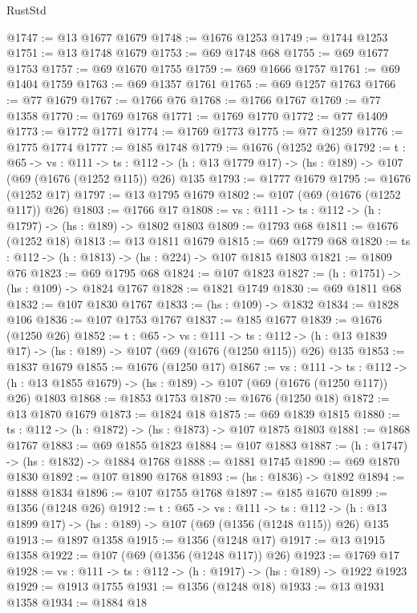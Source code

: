 \begin{lexlean}{RustStd}
\begin{coremodule}
@1747 := @13 @1677 @1679
@1748 := @1676 @1253
@1749 := @1744 @1253
@1751 := @13 @1748 @1679
@1753 := @69 @1748 @68
@1755 := @69 @1677 @1753
@1757 := @69 @1670 @1755
@1759 := @69 @1666 @1757
@1761 := @69 @1404 @1759
@1763 := @69 @1357 @1761
@1765 := @69 @1257 @1763
@1766 := @77 @1679
@1767 := @1766 @76
@1768 := @1766 @1767
@1769 := @77 @1358
@1770 := @1769 @1768
@1771 := @1769 @1770
@1772 := @77 @1409
@1773 := @1772 @1771
@1774 := @1769 @1773
@1775 := @77 @1259
@1776 := @1775 @1774
@1777 := @185 @1748
@1779 := @1676 (@1252 @26)
@1792 := {t : @65} ->
  {vs : @111} ->
  {ts : @112} -> (h : @13 @1779 @17) -> (hs : @189) -> @107 (@69 (@1676 (@1252 @115)) @26) @135
@1793 := @1777 @1679
@1795 := @1676 (@1252 @17)
@1797 := @13 @1795 @1679
@1802 := @107 (@69 (@1676 (@1252 @117)) @26)
@1803 := @1766 @17
@1808 := {vs : @111} -> {ts : @112} -> (h : @1797) -> (hs : @189) -> @1802 @1803
@1809 := @1793 @68
@1811 := @1676 (@1252 @18)
@1813 := @13 @1811 @1679
@1815 := @69 @1779 @68
@1820 := {ts : @112} -> (h : @1813) -> (hs : @224) -> @107 @1815 @1803
@1821 := @1809 @76
@1823 := @69 @1795 @68
@1824 := @107 @1823
@1827 := (h : @1751) -> (hs : @109) -> @1824 @1767
@1828 := @1821 @1749
@1830 := @69 @1811 @68
@1832 := @107 @1830 @1767
@1833 := (hs : @109) -> @1832
@1834 := @1828 @106
@1836 := @107 @1753 @1767
@1837 := @185 @1677
@1839 := @1676 (@1250 @26)
@1852 := {t : @65} ->
  {vs : @111} ->
  {ts : @112} -> (h : @13 @1839 @17) -> (hs : @189) -> @107 (@69 (@1676 (@1250 @115)) @26) @135
@1853 := @1837 @1679
@1855 := @1676 (@1250 @17)
@1867 := {vs : @111} ->
  {ts : @112} -> (h : @13 @1855 @1679) -> (hs : @189) -> @107 (@69 (@1676 (@1250 @117)) @26) @1803
@1868 := @1853 @1753
@1870 := @1676 (@1250 @18)
@1872 := @13 @1870 @1679
@1873 := @1824 @18
@1875 := @69 @1839 @1815
@1880 := {ts : @112} -> (h : @1872) -> (hs : @1873) -> @107 @1875 @1803
@1881 := @1868 @1767
@1883 := @69 @1855 @1823
@1884 := @107 @1883
@1887 := (h : @1747) -> (hs : @1832) -> @1884 @1768
@1888 := @1881 @1745
@1890 := @69 @1870 @1830
@1892 := @107 @1890 @1768
@1893 := (hs : @1836) -> @1892
@1894 := @1888 @1834
@1896 := @107 @1755 @1768
@1897 := @185 @1670
@1899 := @1356 (@1248 @26)
@1912 := {t : @65} ->
  {vs : @111} ->
  {ts : @112} -> (h : @13 @1899 @17) -> (hs : @189) -> @107 (@69 (@1356 (@1248 @115)) @26) @135
@1913 := @1897 @1358
@1915 := @1356 (@1248 @17)
@1917 := @13 @1915 @1358
@1922 := @107 (@69 (@1356 (@1248 @117)) @26)
@1923 := @1769 @17
@1928 := {vs : @111} -> {ts : @112} -> (h : @1917) -> (hs : @189) -> @1922 @1923
@1929 := @1913 @1755
@1931 := @1356 (@1248 @18)
@1933 := @13 @1931 @1358
@1934 := @1884 @18

\end{coremodule}
\end{lexlean}

